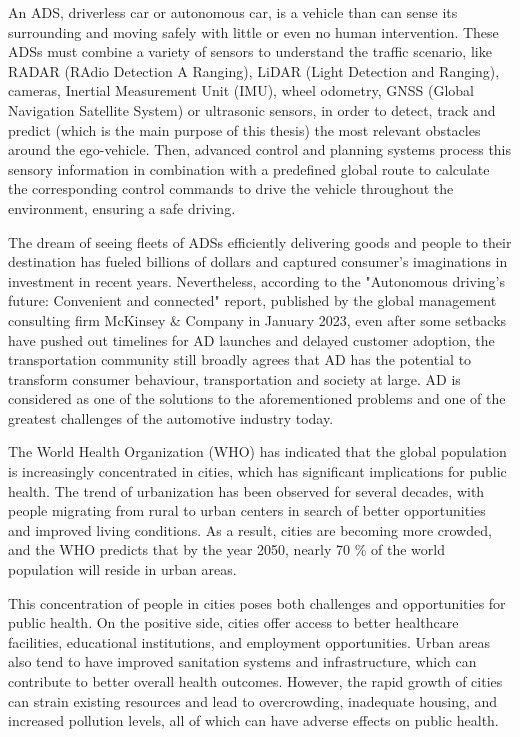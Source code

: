 An \ac{ADS}, driverless car or autonomous car, is a vehicle than can sense its surrounding and moving safely with little or even no human intervention. These \acp{ADS} must combine a variety of sensors to understand the traffic scenario, like RADAR (RAdio Detection A Ranging), LiDAR (Light Detection and Ranging), cameras, Inertial Measurement Unit (IMU), wheel odometry, GNSS (Global Navigation Satellite System) or ultrasonic sensors, in order to detect, track and predict (which is the main purpose of this thesis) the most relevant obstacles around the ego-vehicle. Then, advanced control and planning systems process this sensory information in combination with a predefined global route to calculate the corresponding control commands to drive the vehicle throughout the environment, ensuring a safe driving. 

The dream of seeing fleets of \acp{ADS} efficiently delivering goods and people to their destination has fueled billions of dollars and captured consumer's imaginations in investment in recent years. Nevertheless, according to the "Autonomous driving's future: Convenient and connected" report, published by the global management consulting firm McKinsey \& Company in January 2023, even after some setbacks have pushed out timelines for \ac{AD} launches and delayed customer adoption, the transportation community still broadly agrees that \ac{AD} has the potential to transform consumer behaviour, transportation and society at large. \ac{AD} is considered as one of the solutions to the aforementioned problems and one of the greatest challenges of the automotive industry today. 

The World Health Organization (WHO) has indicated that the global population is increasingly concentrated in cities, which has significant implications for public health. The trend of urbanization has been observed for several decades, with people migrating from rural to urban centers in search of better opportunities and improved living conditions. As a result, cities are becoming more crowded, and the WHO predicts that by the year 2050, nearly 70 \% of the world population will reside in urban areas.

This concentration of people in cities poses both challenges and opportunities for public health. On the positive side, cities offer access to better healthcare facilities, educational institutions, and employment opportunities. Urban areas also tend to have improved sanitation systems and infrastructure, which can contribute to better overall health outcomes. However, the rapid growth of cities can strain existing resources and lead to overcrowding, inadequate housing, and increased pollution levels, all of which can have adverse effects on public health.

